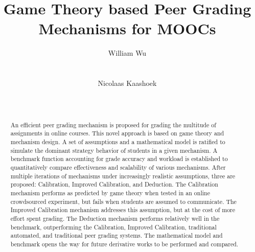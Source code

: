 \documentclass{sigchi}
\begin{document}
\title{Game Theory based Peer Grading Mechanisms for MOOCs}

\author{
  \alignauthor William Wu\\
    \\
    \\
  \alignauthor Nicolaas Kaashoek\\
    \\
    \\
}

\maketitle

\begin{abstract}
An efficient peer grading mechanism is proposed for grading the multitude of assignments in online courses. This novel approach is based on game theory and mechanism design. A set of assumptions and a mathematical model is ratified to simulate the dominant strategy behavior of students in a given mechanism. A benchmark function accounting for grade accuracy and workload is established to quantitatively compare effectiveness and scalability of various mechanisms. After multiple iterations of mechanisms under increasingly realistic assumptions, three are proposed: Calibration, Improved Calibration, and Deduction. The Calibration mechanism performs as predicted by game theory when tested in an online crowdsourced experiment, but fails when students are assumed to communicate. The Improved Calibration mechanism addresses this assumption, but at the cost of more effort spent grading. The Deduction mechanism performs relatively well in the benchmark, outperforming the Calibration, Improved Calibration, traditional automated, and traditional peer grading systems. The mathematical model and benchmark opens the way for future derivative works to be performed and compared.
\end{abstract}


\end{document}
